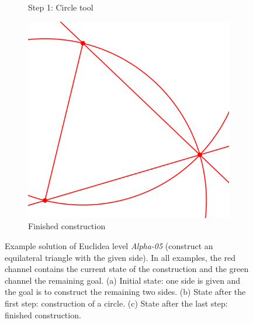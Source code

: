\begin{figure}[tbp]
\begin{subfigure}[b]{0.32\textwidth}
         \caption{Step 1: Circle tool}
         \label{fig:euclidea_example_s1}
     \end{subfigure}
     \hfill
     \begin{subfigure}[b]{0.32\textwidth}
         \centering
         \includegraphics[width=\textwidth]{img/Equilateral_example/input_image4.png}
         \caption{Finished construction}
         \label{fig:euclidea_example_f}
     \end{subfigure}
     \hfill
        \caption{Example solution of Euclidea level \textit{Alpha-05} (construct an equilateral triangle with the given side).
        In all examples, the red channel contains the current state of the construction and the green channel the remaining goal.
        (a) Initial state: one side is given and the goal is to construct the remaining two sides.
        (b) State after the first step: construction of a circle.
        (c) State after the last step: finished construction. 
        }
        \label{fig:euclidea_example}
\end{figure}

